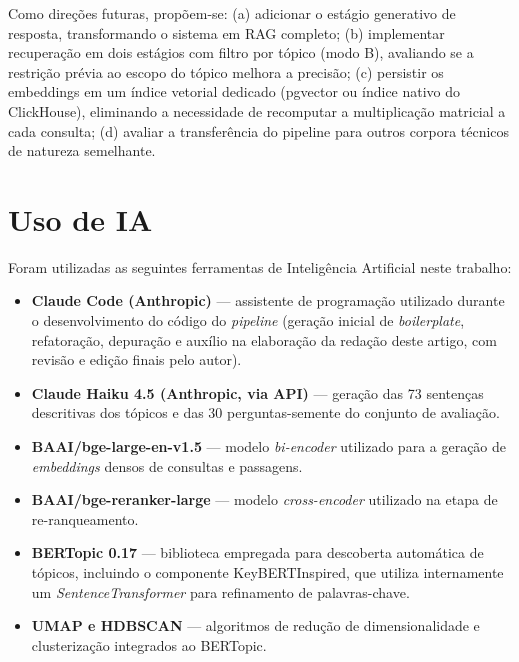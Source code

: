 \documentclass[11pt,a4paper]{article}
\begin{document}
Como direções futuras, propõem-se: (a) adicionar o estágio generativo de resposta, transformando o sistema em RAG completo; (b) implementar recuperação em dois estágios com filtro por tópico (modo B), avaliando se a restrição prévia ao escopo do tópico melhora a precisão; (c) persistir os embeddings em um índice vetorial dedicado (pgvector ou índice nativo do ClickHouse), eliminando a necessidade de recomputar a multiplicação matricial a cada consulta; (d) avaliar a transferência do pipeline para outros corpora técnicos de natureza semelhante.

\section{Uso de IA}

Foram utilizadas as seguintes ferramentas de Inteligência Artificial neste trabalho:

\begin{itemize}
  \item \textbf{Claude Code (Anthropic)} --- assistente de programação utilizado durante o desenvolvimento do código do \textit{pipeline} (geração inicial de \textit{boilerplate}, refatoração, depuração e auxílio na elaboração da redação deste artigo, com revisão e edição finais pelo autor).
  \item \textbf{Claude Haiku 4.5 (Anthropic, via API)} --- geração das 73 sentenças descritivas dos tópicos e das 30 perguntas-semente do conjunto de avaliação.
  \item \textbf{BAAI/bge-large-en-v1.5} --- modelo \textit{bi-encoder} utilizado para a geração de \textit{embeddings} densos de consultas e passagens.
  \item \textbf{BAAI/bge-reranker-large} --- modelo \textit{cross-encoder} utilizado na etapa de re-ranqueamento.
  \item \textbf{BERTopic 0.17} --- biblioteca empregada para descoberta automática de tópicos, incluindo o componente KeyBERTInspired, que utiliza internamente um \textit{SentenceTransformer} para refinamento de palavras-chave.
  \item \textbf{UMAP e HDBSCAN} --- algoritmos de redução de dimensionalidade e clusterização integrados ao BERTopic.
\end{itemize}

\renewcommand{\refname}{Referências Bibliográficas}
\end{document}
